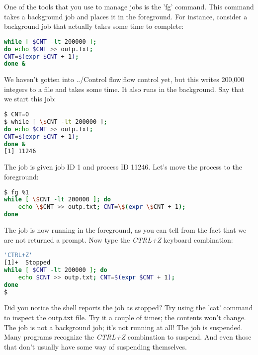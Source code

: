 One of the tools that you use to manage jobs is the 'fg' command. This command
takes a background job and places it in the foreground. For instance, consider
a background job that actually takes some time to complete:
\lstset{basicstyle=\scriptsize, numbers=left, captionpos=b, tabsize=4}
\begin{lstlisting}[caption=A heftier job,language={bash},
xleftmargin=15pt, label=lst:A heftier job]
while [ $CNT -lt 200000 ];
do echo $CNT >> outp.txt;
CNT=$(expr $CNT + 1);
done &
\end{lstlisting}

We haven't gotten into ../Control flow|flow control yet, but this writes
200,000 integers to a file and takes some time. It also runs in the background.
Say that we start this job:
\lstset{basicstyle=\scriptsize, numbers=left, captionpos=b, tabsize=4}
\begin{lstlisting}[caption=Starting the job,language={bash},
xleftmargin=15pt, label=lst:Starting the job]
$ CNT=0
$ while [ \$CNT -lt 200000 ];
do echo $CNT >> outp.txt;
CNT=$(expr $CNT + 1);
done &
[1] 11246
\end{lstlisting}

The job is given job ID 1 and process ID 11246. Let's move the process to the
foreground:
\lstset{basicstyle=\scriptsize, numbers=left, captionpos=b, tabsize=4}
\begin{lstlisting}[caption=Moving the job to the front,language={bash},
breaklines=true,xleftmargin=15pt, label=lst:Moving the job to the front]
$ fg %1
while [ \$CNT -lt 200000 ]; do
    echo \$CNT >> outp.txt; CNT=\$(expr \$CNT + 1);
done
\end{lstlisting}

The job is now running in the foreground, as you can tell from the fact that we
are not returned a prompt. Now type the \textit{CTRL+Z} keyboard combination:
\lstset{basicstyle=\scriptsize, numbers=left, captionpos=b, tabsize=4}
\begin{lstlisting}[caption=Stopping the job,language={bash},
breaklines=true,xleftmargin=15pt, label=lst:Stopping the job]
'CTRL+Z'
[1]+  Stopped 
while [ $CNT -lt 200000 ]; do
    echo $CNT >> outp.txt; CNT=$(expr $CNT + 1);
done
$
\end{lstlisting}

Did you notice the shell reports the job as stopped? Try using the 'cat'
command to inspect the outp.txt file. Try it a couple of times; the contents
won't change. The job is not a background job; it's not running at all! The job
is suspended. Many programs recognize the \textit{CTRL+Z} combination to suspend.
And even those that don't usually have some way of suspending themselves.

